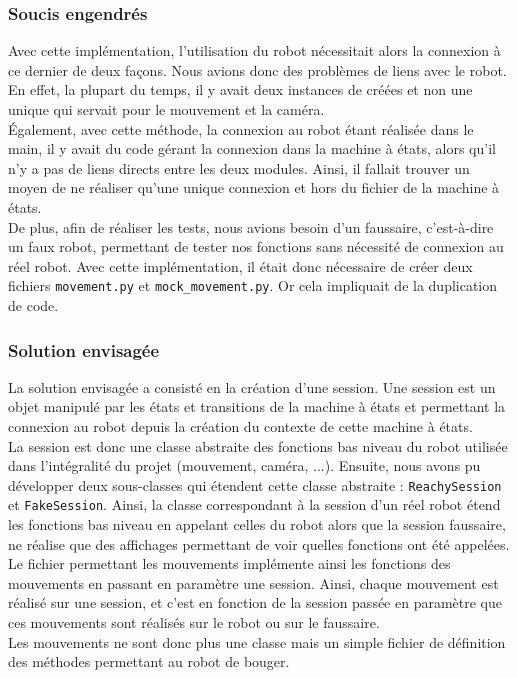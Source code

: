 \documentclass[a4paper,french]{article}
\begin{document}
\subsubsection{Soucis engendrés}
Avec cette implémentation, l'utilisation du robot nécessitait alors la connexion à ce dernier de deux façons. Nous avions donc des problèmes de liens avec le robot. En effet, la plupart du temps, il y avait deux instances de créées et non une unique qui servait pour le mouvement et la caméra. \\

\'Egalement, avec cette méthode, la connexion au robot étant réalisée dans le main, il y avait du code gérant la connexion dans la machine à états, alors qu'il n'y a pas de liens directs entre les deux modules.
Ainsi, il fallait trouver un moyen de ne réaliser qu'une unique connexion et hors du fichier de la machine à états. \\

De plus, afin de réaliser les tests, nous avions besoin d'un faussaire, c'est-à-dire un faux robot, permettant de tester nos fonctions sans nécessité de connexion au réel robot. Avec cette implémentation, il était donc nécessaire de créer deux fichiers \texttt{movement.py} et \texttt{mock\_movement.py}. Or cela impliquait de la duplication de code.

\subsubsection{Solution envisagée}
La solution envisagée a consisté en la création d'une session. Une session est un objet manipulé par les états et transitions de la machine à états et permettant la connexion au robot depuis la création du contexte de cette machine à états. \\

La session est donc une classe abstraite des fonctions bas niveau du robot utilisée dans l'intégralité du projet (mouvement, caméra, ...). Ensuite, nous avons pu développer deux sous-classes qui étendent cette classe abstraite : \texttt{ReachySession} et \texttt{FakeSession}. Ainsi, la classe correspondant à la session d'un réel robot étend les fonctions bas niveau en appelant celles du robot alors que la session faussaire, ne réalise que des affichages permettant de voir quelles fonctions ont été appelées. \\

Le fichier permettant les mouvements implémente ainsi les fonctions des mouvements en passant en paramètre une session. Ainsi, chaque mouvement est réalisé sur une session, et c'est en fonction de la session passée en paramètre que ces mouvements sont réalisés sur le robot ou sur le faussaire. \\ Les mouvements ne sont donc plus une classe mais un simple fichier de définition des méthodes permettant au robot de bouger. \\
\end{document}
